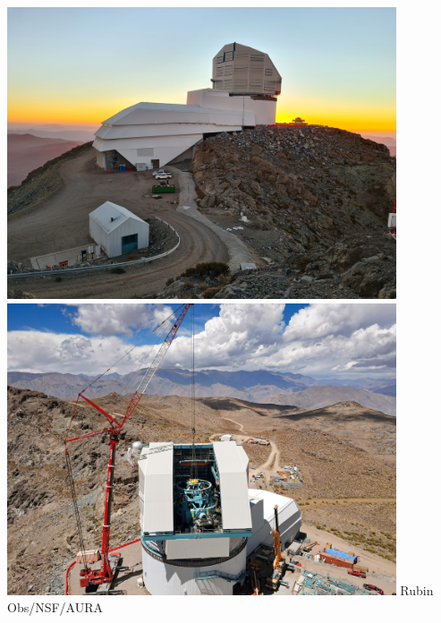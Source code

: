 \documentclass{beamer}
\begin{document}
{\begin{columns}
        \begin{column}{0.5\textwidth}    
            \begin{center}
                \includegraphics[width=0.90\textwidth]{telescope-summit-april21.jpg}
                \newline
                \includegraphics[width=0.90\textwidth]{Heavy_Lifting_at_Vera_C._Rubin_Observatory.jpg}
                \newline
                {\tiny Rubin Obs/NSF/AURA}
            \end{center}
        \end{column}

        \begin{column}{0.5\textwidth}    

            \begin{itemize}


\end{itemize}
\end{column}
\end{columns}}
\end{document}
